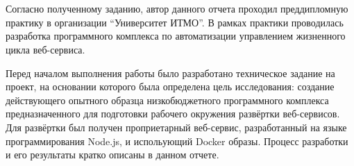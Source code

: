 \section*{}

Согласно полученному заданию, автор данного отчета проходил преддипломную практику в организации “Университет ИТМО”.
В рамках практики проводилась разработка программного комплекса по автоматизации управлением жизненного цикла веб-сервиса.

Перед началом выполнения работы было разработано техническое задание на проект, на основании которого была определена цель исследования:
создание действующего опытного образца низкобюджетного программного комплекса предназначенного для подготовки рабочего окружения развёртки веб-сервисов.
Для развёртки был получен проприетарный веб-сервис, разработанный на языке программирования Node.js, и испольующий Docker образы.
Процесс разработки и его результаты кратко описаны в данном отчете.

